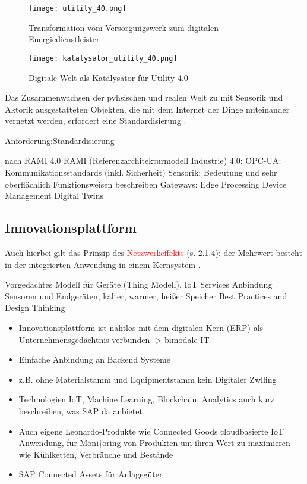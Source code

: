 \begin{figure}[h]
  \texttt{[image: utility\_40.png]}
  \caption[Transformation vom Versorgungswerk zum digitalen Energiedienstleister]{Transformation vom Versorgungswerk zum digitalen Energiedienstleister \citep[S. 13]{Doleski2016}}
\end{figure}

\begin{figure}[h]
  \texttt{[image: kalalysator\_utility\_40.png]}
  \caption[Digitale Welt als Katalysator für Utility 4.0 ]{Digitale Welt als Katalysator für Utility 4.0 \citep[S. 17]{Doleski2016}}
\end{figure}

Das Zusammenwachsen der pyhsischen und realen Welt zu mit Sensorik und Aktorik ausgestatteten Objekten, die mit dem Internet der Dinge miteinander vernetzt werden, erfordert eine Standardisierung \citep{BITKOM2015}.



Anforderung:Standardisierung


nach RAMI 4.0
RAMI (Referenzarchitekturmodell Industrie) 4.0: OPC-UA: Kommunikationsstandards (inkl. Sicherheit)
Sensorik: Bedeutung und sehr oberflächlich Funktionsweisen beschreiben
Gateways: Edge Processing
Device Management
Digital Twins

\subsection{Innovationsplattform}
Auch hierbei gilt das Prinzip des \textcolor{red}{Netzwerkeffekts} (s. 2.1.4): der Mehrwert besteht in der integrierten Anwendung in einem Kernsystem \citep{Elsner2018}.


Vorgedachtes Modell für Geräte (Thing Modell), IoT Services Anbindung Sensoren und Endgeräten, kalter, warmer, heißer Speicher
Best Practices and Design Thinking
\begin{itemize}
  \item Innovationsplattform ist nahtlos mit dem digitalen Kern (ERP) als Unternehmensgedächtnis \citep{Utecht2018} verbunden -> bimodale IT
  \item Einfache Anbindung an Backend Systeme
  \item z.B. ohne Materialstamm und Equipmentstamm kein Digitaler Zwlling
  \item Technologien IoT, Machine Learning, Blockchain, Analytics auch kurz beschreiben, was SAP da anbietet
  \item Auch eigene Leonardo-Produkte wie Connected Goods cloudbasierte IoT Anwendung, für Moni†oring von Produkten um ihren Wert zu maximieren wie Kühlketten, Verbräuche und Bestände
  \item SAP Connected Assets für Anlagegüter
\end{itemize}


